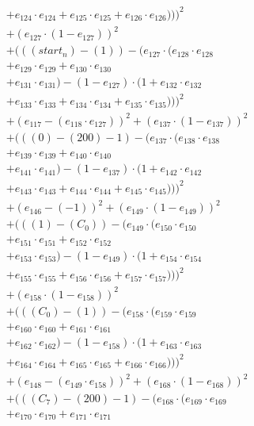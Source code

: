 \documentclass[10pt, a4paper]{article}
\begin{document}
\begin{align*}
& + e_{124} \cdot e_{124} + e_{125} \cdot e_{125} + e_{126} \cdot e_{126})))^{2} \\
& + (e_{127} \cdot (1 - e_{127}))^{2} \\
& + (((start_n) - (1)) - (e_{127} \cdot (e_{128} \cdot e_{128} \\
& + e_{129} \cdot e_{129} + e_{130} \cdot e_{130} \\
& + e_{131} \cdot e_{131}) - (1 - e_{127}) \cdot (1 + e_{132} \cdot e_{132} \\
& + e_{133} \cdot e_{133} + e_{134} \cdot e_{134} + e_{135} \cdot e_{135})))^{2} \\
& + (e_{117} - (e_{118} \cdot e_{127}))^{2} + (e_{137} \cdot (1 - e_{137}))^{2} \\
& + (((0) - (200) - 1) - (e_{137} \cdot (e_{138} \cdot e_{138} \\
& + e_{139} \cdot e_{139} + e_{140} \cdot e_{140} \\
& + e_{141} \cdot e_{141}) - (1 - e_{137}) \cdot (1 + e_{142} \cdot e_{142} \\
& + e_{143} \cdot e_{143} + e_{144} \cdot e_{144} + e_{145} \cdot e_{145})))^{2} \\
& + (e_{146} - (-1))^{2} + (e_{149} \cdot (1 - e_{149}))^{2} \\
& + (((1) - (C_{0})) - (e_{149} \cdot (e_{150} \cdot e_{150} \\
& + e_{151} \cdot e_{151} + e_{152} \cdot e_{152} \\
& + e_{153} \cdot e_{153}) - (1 - e_{149}) \cdot (1 + e_{154} \cdot e_{154} \\
& + e_{155} \cdot e_{155} + e_{156} \cdot e_{156} + e_{157} \cdot e_{157})))^{2} \\
& + (e_{158} \cdot (1 - e_{158}))^{2} \\
& + (((C_{0}) - (1)) - (e_{158} \cdot (e_{159} \cdot e_{159} \\
& + e_{160} \cdot e_{160} + e_{161} \cdot e_{161} \\
& + e_{162} \cdot e_{162}) - (1 - e_{158}) \cdot (1 + e_{163} \cdot e_{163} \\
& + e_{164} \cdot e_{164} + e_{165} \cdot e_{165} + e_{166} \cdot e_{166})))^{2} \\
& + (e_{148} - (e_{149} \cdot e_{158}))^{2} + (e_{168} \cdot (1 - e_{168}))^{2} \\
& + (((C_{7}) - (200) - 1) - (e_{168} \cdot (e_{169} \cdot e_{169} \\
& + e_{170} \cdot e_{170} + e_{171} \cdot e_{171} \\

\end{align*}
\end{document}
